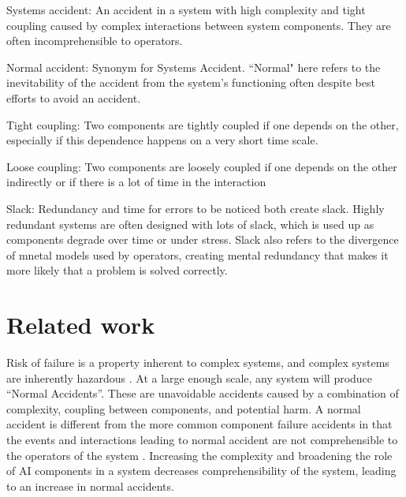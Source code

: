 \documentclass[11pt]{article}
\begin{document}
Systems accident: An accident in a system with high complexity and tight coupling caused by complex
interactions between system components. They are often incomprehensible to operators.
\cite{perrow1999living}

Normal accident: Synonym for Systems Accident. ``Normal" here refers to the inevitability of the
accident from the system's functioning often despite best efforts to avoid an accident.

Tight coupling: Two components are tightly coupled if one depends on the other, especially if this
dependence happens on a very short time scale.

Loose coupling: Two components are loosely coupled if one depends on the other indirectly or if there
is a lot of time in the interaction

Slack: Redundancy and time for errors to be noticed both create slack. Highly redundant systems are
often designed with lots of slack, which is used up as components degrade over time or under
stress. Slack also refers to the divergence of mnetal models used by operators, creating mental
redundancy that makes it more likely that a problem is solved correctly.

\section{Related work}

Risk of failure is a property inherent to complex systems, and complex systems are inherently
hazardous \cite{cook1998complex}.  At a large enough scale, any system will produce ``Normal
Accidents''. These are unavoidable accidents caused by a combination of complexity, coupling between
components, and potential harm. A normal accident is different from the more common component
failure accidents in that the events and interactions leading to normal accident are not
comprehensible to the operators of the system \cite{perrow1984living}. Increasing the complexity
and broadening the role of AI components in a system decreases comprehensibility of the system,
leading to an increase in normal accidents.
\end{document}
